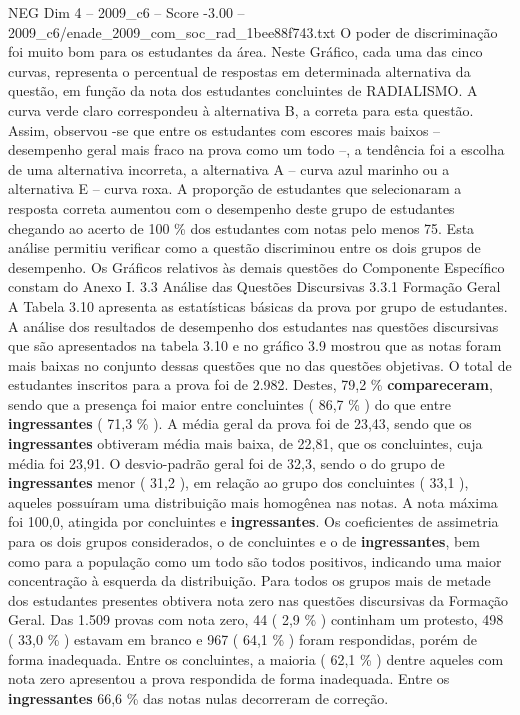 \begin{textsample}{NEG Dim 4 – 2009\_c6 – Score -3.00 – 2009\_c6/enade\_2009\_com\_soc\_rad\_1bee88f743.txt}
O poder de discriminação foi muito bom para os estudantes da área.
Neste Gráfico, cada uma das cinco curvas, representa o percentual de respostas em determinada alternativa da questão, em função da nota dos estudantes concluintes de RADIALISMO.
A curva verde claro correspondeu à alternativa B, a correta para esta questão.
Assim, observou -se que entre os estudantes com escores mais baixos – desempenho geral mais fraco na prova como um todo –, a tendência foi a escolha de uma alternativa incorreta, a alternativa A – curva azul marinho ou a alternativa E – curva roxa.
A proporção de estudantes que selecionaram a resposta correta aumentou com o desempenho deste grupo de estudantes chegando ao acerto de 100 \% dos estudantes com notas pelo menos 75.
Esta análise permitiu verificar como a questão discriminou entre os dois grupos de desempenho.
Os Gráficos relativos às demais questões do Componente Específico constam do Anexo I. 3.3 Análise das Questões Discursivas 3.3.1 Formação Geral A Tabela 3.10 apresenta as estatísticas básicas da prova por grupo de estudantes.
A análise dos resultados de desempenho dos estudantes nas questões discursivas que são apresentados na tabela 3.10 e no gráfico 3.9 mostrou que as notas foram mais baixas no conjunto dessas questões que no das questões objetivas.
O total de estudantes inscritos para a prova foi de 2.982.
Destes, 79,2 \% \textbf{compareceram}, sendo que a presença foi maior entre concluintes ( 86,7 \% ) do que entre \textbf{ingressantes} ( 71,3 \% ).
A média geral da prova foi de 23,43, sendo que os \textbf{ingressantes} obtiveram média mais baixa, de 22,81, que os concluintes, cuja média foi 23,91.
O desvio-padrão geral foi de 32,3, sendo o do grupo de \textbf{ingressantes} menor ( 31,2 ), em relação ao grupo dos concluintes ( 33,1 ), aqueles possuíram uma distribuição mais homogênea nas notas.
A nota máxima foi 100,0, atingida por concluintes e \textbf{ingressantes}.
Os coeficientes de assimetria para os dois grupos considerados, o de concluintes e o de \textbf{ingressantes}, bem como para a população como um todo são todos positivos, indicando uma maior concentração à esquerda da distribuição.
Para todos os grupos mais de metade dos estudantes presentes obtivera nota zero nas questões discursivas da Formação Geral.
Das 1.509 provas com nota zero, 44 ( 2,9 \% ) continham um protesto, 498 ( 33,0 \% ) estavam em branco e 967 ( 64,1 \% ) foram respondidas, porém de forma inadequada.
Entre os concluintes, a maioria ( 62,1 \% ) dentre aqueles com nota zero apresentou a prova respondida de forma inadequada.
Entre os \textbf{ingressantes} 66,6 \% das notas nulas decorreram de correção.

\end{textsample}
